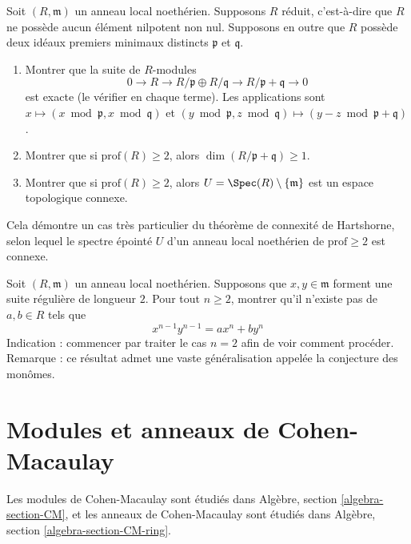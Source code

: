 \begin{exercise}
\label{exercise-Hartshorne-reduced}
Soit $(R, \mathfrak m)$ un anneau local noethérien.
Supposons $R$ réduit, c'est-à-dire que $R$ ne possède aucun élément
nilpotent non nul. Supposons en outre que $R$ possède deux
idéaux premiers minimaux distincts $\mathfrak p$ et $\mathfrak q$.
\begin{enumerate}
\item Montrer que la suite de $R$-modules
$$
0 \to R \to R/\mathfrak p \oplus R/\mathfrak q \to
R/\mathfrak p + \mathfrak q \to 0
$$
est exacte (le vérifier en chaque terme). Les applications sont
$x \mapsto (x \bmod \mathfrak p, x \bmod \mathfrak q)$
et $(y \bmod \mathfrak p, z \bmod \mathfrak q) \mapsto
(y - z \bmod \mathfrak p + \mathfrak q)$.
\item Montrer que si $\text{prof}(R) \geq 2$, alors
$\dim(R/\mathfrak p + \mathfrak q) \geq 1$.
\item Montrer que si $\text{prof}(R) \geq 2$, alors
$U = \Spec(R) \setminus \{\mathfrak m\}$ est un espace topologique
connexe.
\end{enumerate}
Cela démontre un cas très particulier du théorème de connexité de Hartshorne,
selon lequel le spectre épointé $U$ d'un anneau local
noethérien de $\text{prof} \geq 2$ est connexe.
\end{exercise}

\begin{exercise}
\label{exercise-depth-2}
Soit $(R, \mathfrak m)$ un anneau local noethérien.
Supposons que $x, y \in \mathfrak m$ forment une suite régulière de longueur $2$.
Pour tout $n \geq 2$, montrer qu'il n'existe pas de $a, b \in R$ tels que
$$
x^{n - 1}y^{n - 1} = a x^n + b y^n
$$
Indication : commencer par traiter le cas $n = 2$ afin de voir comment procéder.
Remarque : ce résultat admet une vaste généralisation
appelée la conjecture des monômes.
\end{exercise}







\section{Modules et anneaux de Cohen-Macaulay}
\label{section-CM}

\noindent
Les modules de Cohen-Macaulay sont étudiés dans
Algèbre, section \ref{algebra-section-CM},
et les anneaux de Cohen-Macaulay sont étudiés dans
Algèbre, section \ref{algebra-section-CM-ring}.

